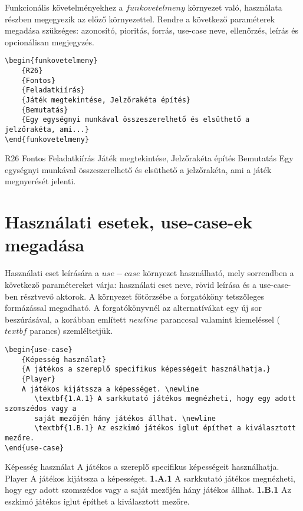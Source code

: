 \documentclass[]{article}
\begin{document}
Funkcionális követelményekhez a $funkovetelmeny$ környezet való, használata részben megegyezik az előző környezettel. Rendre a következő paraméterek megadása szükséges: azonosító, pioritás, forrás, use-case neve, ellenőrzés, leírás és opcionálisan megjegyzés.

\begin{lstlisting}
\begin{funkovetelmeny}
    {R26}
    {Fontos}
    {Feladatkiírás}
    {Játék megtekintése, Jelzőrakéta építés}
    {Bemutatás}
    {Egy egységnyi munkával összeszerelhető és elsüthető a jelzőrakéta, ami...}
\end{funkovetelmeny}
\end{lstlisting}

\begin{funkovetelmeny}
    {R26}
    {Fontos}
    {Feladatkiírás}
    {Játék megtekintése, Jelzőrakéta építés}
    {Bemutatás}
    {Egy egységnyi munkával összeszerelhető és elsüthető a jelzőrakéta, ami a játék megnyerését jelenti.}
\end{funkovetelmeny} 

\section{Használati esetek, use-case-ek megadása}
Használati eset leírására a $use-case$ környezet használható, mely sorrendben a következő paramétereket várja: használati eset neve, rövid leírása és a use-case-ben résztvevő aktorok. A környezet főtörzsébe a forgatóköny tetszőleges formázással megadható. A forgatókönyvnél az alternatívákat egy új sor beszúrásával, a korábban említett $newline$ paranccsal valamint kiemeléssel ($textbf$ parancs) szemléltetjük. 
\begin{lstlisting}
\begin{use-case}
    {Képesség használat}
    {A játékos a szereplő specifikus képességeit használhatja.}
    {Player}
    A játékos kijátssza a képességet. \newline
       \textbf{1.A.1} A sarkkutató játékos megnézheti, hogy egy adott szomszédos vagy a
       saját mezőjén hány játékos állhat. \newline
       \textbf{1.B.1} Az eszkimó játékos iglut építhet a kiválasztott mezőre.	
\end{use-case}
\end{lstlisting}
\begin{use-case}
    {Képesség használat}
    {A játékos a szereplő specifikus képességeit használhatja.}
    {Player}
    A játékos kijátssza a képességet. \newline
        \textbf{1.A.1} A sarkkutató játékos megnézheti, hogy egy adott szomszédos vagy a saját mezőjén hány játékos állhat. \newline
        \textbf{1.B.1} Az eszkimó játékos iglut építhet a kiválasztott mezőre.	
\end{use-case}
\end{document}
